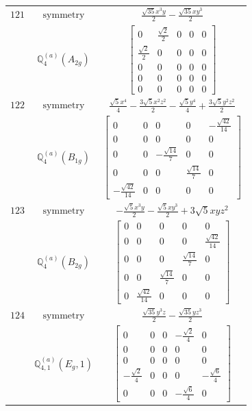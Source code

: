 \documentclass[fleqn,8pt,landscape]{jsarticle}
\begin{document}
\begin{longtable}{ccc}
$ 121 $ & $ \text{symmetry} $ & $ \frac{\sqrt{35} x^{3} y}{2} - \frac{\sqrt{35} x y^{3}}{2} $ \\
$  $ & $ \mathbb{Q}_{4}^{(a)}(A_{2g}) $ & $ \begin{bmatrix} 0 & \frac{\sqrt{2}}{2} & 0 & 0 & 0 \\ \frac{\sqrt{2}}{2} & 0 & 0 & 0 & 0 \\ 0 & 0 & 0 & 0 & 0 \\ 0 & 0 & 0 & 0 & 0 \\ 0 & 0 & 0 & 0 & 0 \end{bmatrix} $ \\ \hline
$ 122 $ & $ \text{symmetry} $ & $ \frac{\sqrt{5} x^{4}}{4} - \frac{3 \sqrt{5} x^{2} z^{2}}{2} - \frac{\sqrt{5} y^{4}}{4} + \frac{3 \sqrt{5} y^{2} z^{2}}{2} $ \\
$  $ & $ \mathbb{Q}_{4}^{(a)}(B_{1g}) $ & $ \begin{bmatrix} 0 & 0 & 0 & 0 & - \frac{\sqrt{42}}{14} \\ 0 & 0 & 0 & 0 & 0 \\ 0 & 0 & - \frac{\sqrt{14}}{7} & 0 & 0 \\ 0 & 0 & 0 & \frac{\sqrt{14}}{7} & 0 \\ - \frac{\sqrt{42}}{14} & 0 & 0 & 0 & 0 \end{bmatrix} $ \\ \hline
$ 123 $ & $ \text{symmetry} $ & $ - \frac{\sqrt{5} x^{3} y}{2} - \frac{\sqrt{5} x y^{3}}{2} + 3 \sqrt{5} x y z^{2} $ \\
$  $ & $ \mathbb{Q}_{4}^{(a)}(B_{2g}) $ & $ \begin{bmatrix} 0 & 0 & 0 & 0 & 0 \\ 0 & 0 & 0 & 0 & \frac{\sqrt{42}}{14} \\ 0 & 0 & 0 & \frac{\sqrt{14}}{7} & 0 \\ 0 & 0 & \frac{\sqrt{14}}{7} & 0 & 0 \\ 0 & \frac{\sqrt{42}}{14} & 0 & 0 & 0 \end{bmatrix} $ \\ \hline
$ 124 $ & $ \text{symmetry} $ & $ \frac{\sqrt{35} y^{3} z}{2} - \frac{\sqrt{35} y z^{3}}{2} $ \\
$  $ & $ \mathbb{Q}_{4,1}^{(a)}(E_{g},1) $ & $ \begin{bmatrix} 0 & 0 & 0 & - \frac{\sqrt{2}}{4} & 0 \\ 0 & 0 & 0 & 0 & 0 \\ 0 & 0 & 0 & 0 & 0 \\ - \frac{\sqrt{2}}{4} & 0 & 0 & 0 & - \frac{\sqrt{6}}{4} \\ 0 & 0 & 0 & - \frac{\sqrt{6}}{4} & 0 \end{bmatrix} $ \\ \hline

\end{longtable}
\end{document}
